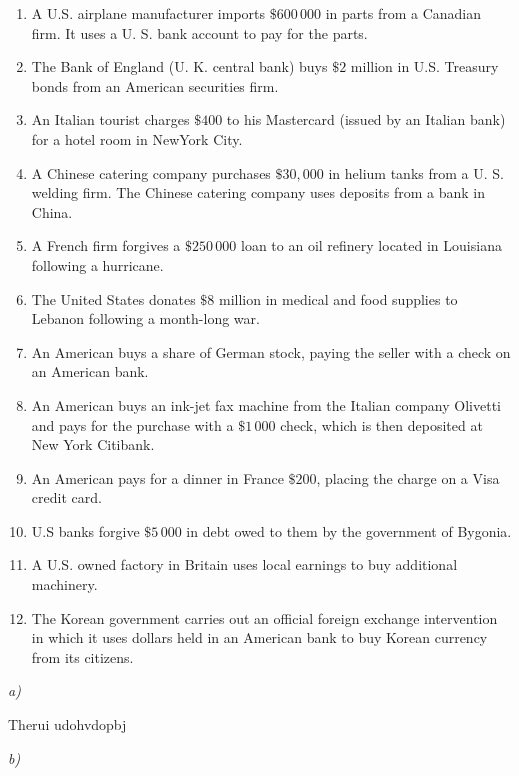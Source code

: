 \documentclass[11pt, a4paper]{article}
\begin{document}
\begin{enumerate}[label=\emph{\alph*}), topsep = \lineskip, itemsep = \lineskip, partopsep = \lineskip, parsep = \lineskip]
	\item A U.S. airplane manufacturer imports $\$600\,000$ in parts from a Canadian firm. It uses a U. S. bank account to pay for the parts.
  \item The Bank of England (U. K. central bank) buys $\$2$ million in U.S. Treasury bonds
  from an American securities firm.
  \item An Italian tourist charges $\$400$ to his Mastercard (issued by an Italian bank) for a
  hotel room in NewYork City.
  \item A Chinese catering company purchases $\$30,000$ in helium tanks from a U. S. welding
  firm. The Chinese catering company uses deposits from a bank in China.
  \item A French firm forgives a $\$250\,000$ loan to an oil refinery located in Louisiana
  following a hurricane.
  \item The United States donates $\$8$ million in medical and food supplies to Lebanon
  following a month-long war.
  \item An American buys a share of German stock, paying the seller with a check on an
  American bank.
  \item An American buys an ink-jet fax machine from the Italian company Olivetti and pays
  for the purchase with a $\$1\,000$ check, which is then deposited at New York Citibank.
  \item An American pays for a dinner in France $\$200$, placing the charge on a Visa credit
  card.
  \item U.S banks forgive $\$5\,000$ in debt owed to them by the government of Bygonia.
  \item A U.S. owned factory in Britain uses local earnings to buy additional machinery.
  \item The Korean government carries out an official foreign exchange intervention in which
  it uses dollars held in an American bank to buy Korean currency from its citizens.
\end{enumerate}

\dotfill

\textit{a)}

\vspace{0.075in}
Therui udohvdopbj
\vspace{0.075in}

\textit{b)}
\end{document}
